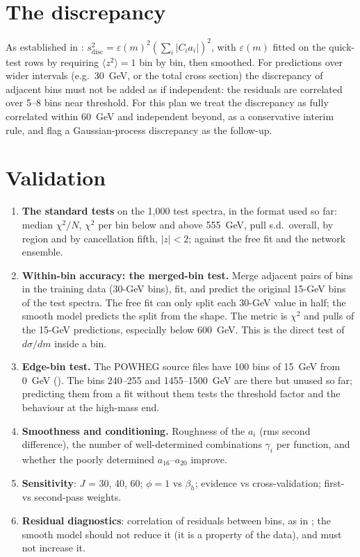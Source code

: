 \section{The discrepancy}
\label{sec:disc}

As established in : $s_\text{disc}^2 = \varepsilon(m)^2
(\sum_i|C_i a_i|)^2$, with $\varepsilon(m)$ fitted on the quick-test rows by requiring
$\langle z^2\rangle = 1$ bin by bin, then smoothed. For predictions over wider intervals
(e.g.\ 30~GeV, or the total cross section) the discrepancy of adjacent bins must not be added
as if independent: the residuals are correlated over 5--8 bins near threshold. For this plan we
treat the discrepancy as fully correlated within 60~GeV and independent beyond, as a
conservative interim rule, and flag a Gaussian-process discrepancy as the follow-up.

\section{Validation}
\label{sec:validation}

\begin{enumerate}
  \item \textbf{The standard tests} on the 1,000 test spectra, in the format used so far:
    median $\chi^2/N$, $\chi^2$ per bin below and above 555~GeV, pull s.d.\ overall, by
    region and by cancellation fifth, $|z|<2$; against the free fit and the network
    ensemble.
  \item \textbf{Within-bin accuracy: the merged-bin test.} Merge adjacent pairs of bins in the
    training data (30-GeV bins), fit, and predict the original 15-GeV bins of the test
    spectra. The free fit can only split each 30-GeV value in half; the smooth model predicts
    the split from the shape. The metric is $\chi^2$ and pulls of the 15-GeV predictions,
    especially below 600~GeV. This is the direct test of $d\sigma/dm$ inside a bin.
  \item \textbf{Edge-bin test.} The POWHEG source files have 100 bins of 15~GeV from 0~GeV
    (). The bins 240--255 and 1455--1500~GeV are there but unused so far;
    predicting them from a fit without them tests the threshold factor and the behaviour at
    the high-mass end.
  \item \textbf{Smoothness and conditioning.} Roughness of the $a_i$ (rms second difference),
    the number of well-determined combinations $\gamma_i$ per function, and whether the poorly
    determined $a_{16}$--$a_{20}$ improve.
  \item \textbf{Sensitivity}: $J$ = 30, 40, 60; $\phi = 1$ vs $\beta_h$; evidence vs
    cross-validation; first- vs second-pass weights.
  \item \textbf{Residual diagnostics}: correlation of residuals between bins, as in
    ; the smooth model should not reduce it (it is a property of
    the data), and must not increase it.
\end{enumerate}

